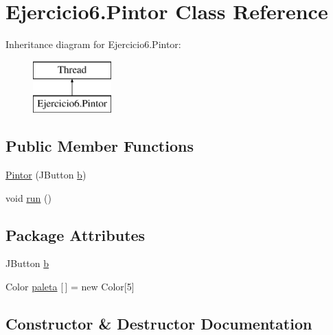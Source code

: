 \hypertarget{class_ejercicio6_1_1_pintor}{}\section{Ejercicio6.\+Pintor Class Reference}
\label{class_ejercicio6_1_1_pintor}
Inheritance diagram for Ejercicio6.\+Pintor\+:\begin{figure}[H]
\begin{center}
\leavevmode
\includegraphics[height=2.000000cm]{class_ejercicio6_1_1_pintor}
\end{center}
\end{figure}
\subsection*{Public Member Functions}
\begin{DoxyCompactItemize}
\item 
\mbox{\hyperlink{class_ejercicio6_1_1_pintor_a5d5a367fdb3202719bebd5583463f3d0}{Pintor}} (J\+Button \mbox{\hyperlink{class_ejercicio6_1_1_pintor_aec7eeb4a5b66d768545833f994d68960}{b}})
\item 
void \mbox{\hyperlink{class_ejercicio6_1_1_pintor_ab900b0e9aaeb5bf3ae8a013381cb63ba}{run}} ()
\end{DoxyCompactItemize}
\subsection*{Package Attributes}
\begin{DoxyCompactItemize}
\item 
J\+Button \mbox{\hyperlink{class_ejercicio6_1_1_pintor_aec7eeb4a5b66d768545833f994d68960}{b}}
\item 
Color \mbox{\hyperlink{class_ejercicio6_1_1_pintor_aba0f36a5798f20695b1fa58540c2129e}{paleta}} \mbox{[}$\,$\mbox{]} = new Color\mbox{[}5\mbox{]}
\end{DoxyCompactItemize}


\subsection{Constructor \& Destructor Documentation}
\mbox{\label{class_ejercicio6_1_1_pintor_a5d5a367fdb3202719bebd5583463f3d0}} 
